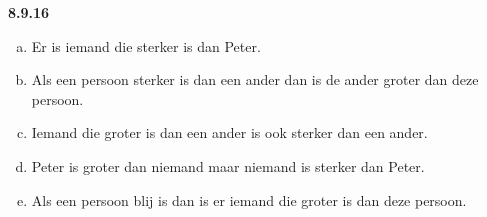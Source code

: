 \vspace{2mm}
\noindent \textbf{8.9.16}
\newline
\begin{enumerate}[(a)]
\item Er is iemand die sterker is dan Peter.
\item Als een persoon sterker is dan een ander dan is de ander groter dan deze persoon.
\item Iemand die groter is dan een ander is ook sterker dan een ander.
\item Peter is groter dan niemand maar niemand is sterker dan Peter.
\item Als een persoon blij is dan is er iemand die groter is dan deze persoon.
\end{enumerate}

	
